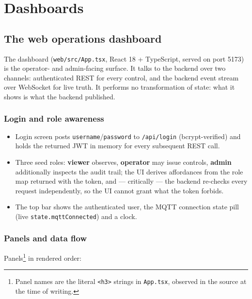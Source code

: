 \chapter{Dashboards}\label{cha:dashboards}

\section{The web operations dashboard}

The dashboard (\texttt{web/src/App.tsx}, React 18 + TypeScript, served on
port 5173) is the operator- and admin-facing surface. It talks to the
backend over two channels: authenticated REST for every control, and the
backend event stream over WebSocket for live truth. It performs no
transformation of state: what it shows is what the backend published.

\subsection{Login and role awareness}

\begin{itemize}
  \item Login screen posts \texttt{username}/\texttt{password} to
        \texttt{/api/login} (bcrypt-verified) and holds the returned JWT
        in memory for every subsequent REST call.
  \item Three seed roles: \textbf{viewer} observes, \textbf{operator} may
        issue controls, \textbf{admin} additionally inspects the audit
        trail; the UI derives affordances from the role map returned with
        the token, and --- critically --- the backend re-checks every
        request independently, so the UI cannot grant what the token
        forbids.
  \item The top bar shows the authenticated user, the MQTT connection
        state pill (live \texttt{state.mqttConnected}) and a clock.
\end{itemize}

\subsection{Panels and data flow}

Panels\footnote{Panel names are the literal \texttt{<h3>} strings in
\texttt{App.tsx}, observed in the source at the time of writing.} in
rendered order:

